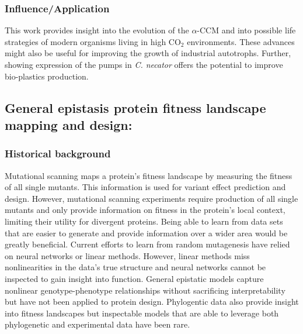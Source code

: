 \documentclass{article}
\begin{document}
\subsubsection{Influence/Application}
This work provides insight into the evolution of the $\alpha$-CCM and into possible life strategies of modern organisms living in high CO$_2$ environments.
These advances might also be useful for improving the growth of industrial autotrophs.
Further, showing expression of the pumps in \textit{C. necator} offers the potential to improve bio-plastics production.

%
\nocite{Flamholz2022-yo}
\printbibliography[heading=none]


\subsection{General epistasis protein fitness landscape mapping and design:}
\subsubsection{Historical background}
Mutational scanning maps a protein's fitness landscape by measuring the fitness of all single mutants.
This information is used for variant effect prediction and design.
However, mutational scanning experiments require production of all single mutants and only provide information on fitness in the protein's local context, limiting their utility for divergent proteins.
Being able to learn from data sets that are easier to generate and provide information over a wider area would be greatly beneficial.
Current efforts to learn from random mutagenesis have relied on neural networks or linear methods.
However, linear methods miss nonlinearities in the data's true structure and neural networks cannot be inspected to gain insight into function.
General epistatic models capture nonlinear genotype-phenotype relationships without sacrificing interpretability but have not been applied to protein design.
Phylogentic data also provide insight into fitness landscapes but inspectable models that are able to leverage both phylogenetic and experimental data have been rare.
%
\end{document}
